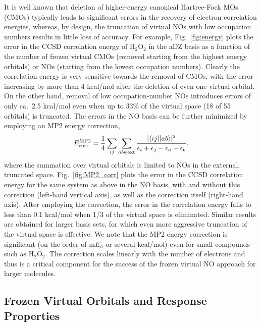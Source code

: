 \documentclass[11pt,article]{achemso}
\begin{document}
It is well known that deletion of higher-energy canonical Hartree-Fock MOs
(CMOs) typically leads to significant errors in the recovery of electron
correlation energies, whereas, by design, the truncation of virtual NOs with
low occupation numbers results in little loss of accuracy.\cite{Landau10,Taube05,Taube08}
For example, Fig.~\ref{fig:energy} plots the error in
the CCSD correlation energy of H$_2$O$_2$ in the aDZ basis as a function of
the number of frozen virtual CMOs (removed starting from the highest energy
orbitals) or NOs (starting from the lowest occupation numbers).  Clearly the
correlation energy is very sensitive towards the removal of CMOs, with the
error increasing by more than 4 kcal/mol after the deletion of even one
virtual orbital.  On the other hand, removal of low occupation-number NOs
introduces errors of only ca.\ 2.5 kcal/mol even when up to 33\% of the
virtual space (18 of 55 orbitals) is truncated.  The errors in
the NO basis can be further minimized by employing an MP2 energy correction,
\begin{equation}
E^{\rm MP2}_{\rm corr} = \frac{1}{4} \sum_{ij} \sum_{ab \in {\rm ext}} \frac{|\langle
ij||ab\rangle|^2}{\epsilon_i + \epsilon_j - \epsilon_a - \epsilon_b}.
\label{Eq:MP2}
\end{equation}
where the summation over virtual orbitals is limited to NOs in the external,
truncated space.  Fig.~\ref{fig:MP2_corr} plots the error in the CCSD
correlation energy for the same system as above in the NO basis, with and
without this correction (left-hand vertical axis), as well as the correction
itself (right-hand axis).  After employing the correction, the error in the
correlation energy falls to less than 0.1 kcal/mol when 1/3 of the virtual
space is eliminated.  Similar results are obtained for larger basis sets, for
which even more aggressive truncation of the virtual space is effective.  We
note that the MP2 energy correction is significant (on the order of m$E_h$ or
several kcal/mol) even for small compounds such as H$_2$O$_2$.  The correction
scales linearly with the number of electrons and thus is a critical component
for the success of the frozen virtual NO approach for larger molecules.

\subsection{Frozen Virtual Orbitals and Response Properties}
\end{document}
